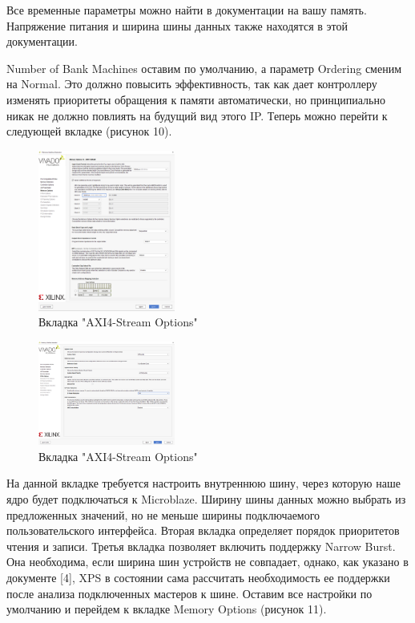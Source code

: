 \documentclass[a4paper,oneside ,14pt]{extreport}
\begin{document}
Все временные параметры можно найти в документации на вашу память. Напряжение питания и ширина шины данных также находятся в этой документации.

Number of Bank Machines оставим по умолчанию, а параметр Ordering сменим на Normal. Это должно повысить эффективность, так как дает контроллеру изменять приоритеты обращения к памяти автоматически, но принципиально никак не должно повлиять на будущий вид этого IP. Теперь можно перейти к следующей вкладке (рисунок 10).

\begin{figure}[h]
	\centering
	\includegraphics[width=0.4\textwidth]{image/mig_6.png}
	\caption{Вкладка "AXI4-Stream Options"}
	\label{cordic_axi4_stream_options}
\end{figure}

\begin{figure}[h]
	\centering
	\includegraphics[width=0.4\textwidth]{image/mig_7.png}
	\caption{Вкладка "AXI4-Stream Options"}
	\label{cordic_axi4_stream_options}
\end{figure}

На данной вкладке требуется настроить внутреннюю шину, через которую наше ядро будет подключаться к Microblaze. Ширину шины данных можно выбрать из предложенных значений, но не меньше ширины подключаемого пользовательского интерфейса. Вторая вкладка определяет порядок приоритетов чтения и записи. Третья вкладка позволяет включить поддержку Narrow Burst. Она необходима, если ширина шин устройств не совпадает, однако, как указано в документе [4], XPS в состоянии сама рассчитать необходимость ее поддержки после анализа подключенных мастеров к шине. Оставим все настройки по умолчанию и перейдем к вкладке Memory Options (рисунок 11).
\end{document}
